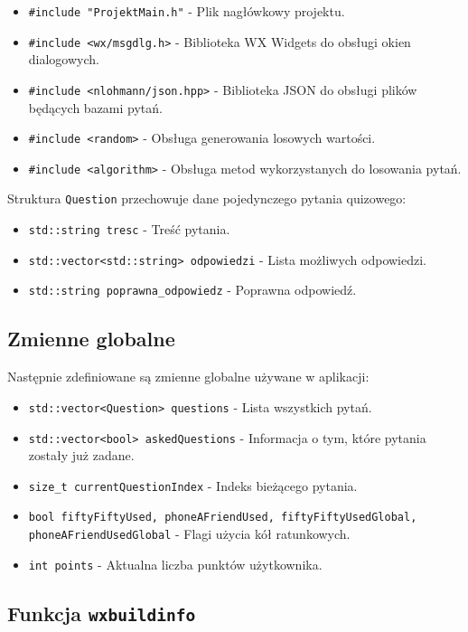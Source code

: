 \documentclass[]{article}
\begin{document}
	\begin{itemize}
		\item \texttt{\#include "ProjektMain.h"} - Plik nagłówkowy projektu.
		\item \texttt{\#include <wx/msgdlg.h>} - Biblioteka WX Widgets do obsługi okien dialogowych.
		\item \texttt{\#include <nlohmann/json.hpp>} - Biblioteka JSON do obsługi plików będących bazami pytań.
		\item \texttt{\#include <random>} - Obsługa generowania losowych wartości.
		\item \texttt{\#include <algorithm>} - Obsługa metod wykorzystanych do losowania pytań.
	\end{itemize}
	
	Struktura \texttt{Question} przechowuje dane pojedynczego pytania quizowego:
	
	\begin{itemize}
		\item \texttt{std::string tresc} - Treść pytania.
		\item \texttt{std::vector<std::string> odpowiedzi} - Lista możliwych odpowiedzi.
		\item \texttt{std::string poprawna\_odpowiedz} - Poprawna odpowiedź.
	\end{itemize}
	
	\subsection{Zmienne globalne}
	
	Następnie zdefiniowane są zmienne globalne używane w aplikacji:
	
	\begin{itemize}
		\item \texttt{std::vector<Question> questions} - Lista wszystkich pytań.
		\item \texttt{std::vector<bool> askedQuestions} - Informacja o tym, które pytania zostały już zadane.
		\item \texttt{size\_t currentQuestionIndex} - Indeks bieżącego pytania.
		\item \texttt{bool fiftyFiftyUsed, phoneAFriendUsed, fiftyFiftyUsedGlobal, phoneAFriendUsedGlobal} - Flagi użycia kół ratunkowych.
		\item \texttt{int points} - Aktualna liczba punktów użytkownika.
	\end{itemize}
	
	\subsection{Funkcja \texttt{wxbuildinfo}}
	
\end{document}
